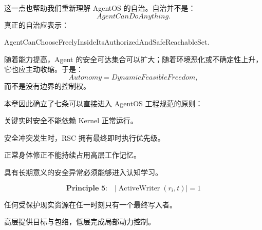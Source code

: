 这一点也帮助我们重新理解 AgentOS 的自治。自治并不是：
\[
AgentCanDoAnything.
\]
真正的自治应表示：
\begin{statementbox}
AgentCanChooseFreelyInsideItsAuthorizedAndSafeReachableSet.
\end{statementbox}
随着能力提高，Agent 的安全可达集合可以扩大；随着环境恶化或不确定性上升，它也应主动收缩。于是：
\[
Autonomy
=
DynamicFeasibleFreedom,
\]
而不是没有边界的控制权。

本章因此确立了七条可以直接进入 AgentOS 工程规范的原则：

\begin{statementbox}
\centering
{}
\end{statementbox}

关键实时安全不能依赖 Kernel 正常运行。

\begin{statementbox}
\centering
{}
\end{statementbox}

安全冲突发生时，RSC 拥有最终即时执行优先级。

\begin{statementbox}
\centering
{}
\end{statementbox}

正常身体修正不能持续占用高层工作记忆。

\begin{statementbox}
\centering
{}
\end{statementbox}

具有长期意义的安全异常必须能够进入认知学习。

\[
\boxed{
\textbf{Principle 5:}\quad
|\operatorname{ActiveWriter}(r_i,t)|=1
}
\]

任何受保护现实资源在任一时刻只有一个最终写入者。

\begin{statementbox}
\centering
{}
\end{statementbox}

高层提供目标与包络，低层完成局部动力控制。

